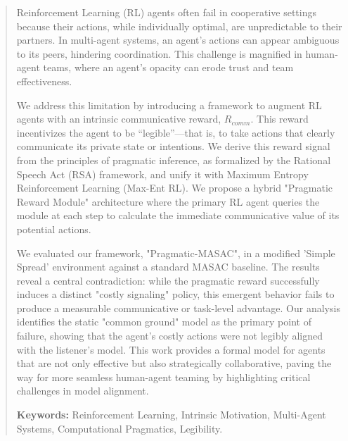\documentclass[12pt, a4paper]{report}
\begin{document}
\begin{abstract}
    \noindent
    
Reinforcement Learning (RL) agents often fail in cooperative settings because their actions, while individually optimal, are unpredictable to their partners. In multi-agent systems, an agent’s actions can appear ambiguous to its peers, hindering coordination. This challenge is magnified in human-agent teams, where an agent’s opacity can erode trust and team effectiveness.

We address this limitation by introducing a framework to augment RL agents with an intrinsic communicative reward, $R_{comm}$. This reward incentivizes the agent to be “legible”—that is, to take actions that clearly communicate its private state or intentions. We derive this reward signal from the principles of pragmatic inference, as formalized by the Rational Speech Act (RSA) framework, and unify it with Maximum Entropy Reinforcement Learning (Max-Ent RL). We propose a hybrid "Pragmatic Reward Module" architecture where the primary RL agent queries the module at each step to calculate the immediate communicative value of its potential actions.

We evaluated our framework, "Pragmatic-MASAC", in a modified ’Simple Spread’ environment against a standard MASAC baseline. The results reveal a central contradiction: while the pragmatic reward successfully induces a distinct "costly signaling" policy, this emergent behavior fails to produce a measurable communicative or task-level advantage. Our analysis identifies the static "common ground" model as the primary point of failure, showing that the agent’s costly actions were not legibly aligned with the listener’s model. This work provides a formal model for agents that are not only effective but also strategically collaborative, paving the way for more seamless human-agent teaming by highlighting critical challenges in model alignment.
    
    \vfill %
    \noindent\textbf{Keywords:} Reinforcement Learning, Intrinsic Motivation, Multi-Agent Systems, Computational Pragmatics, Legibility.
\end{abstract}


\tableofcontents
\end{document}
